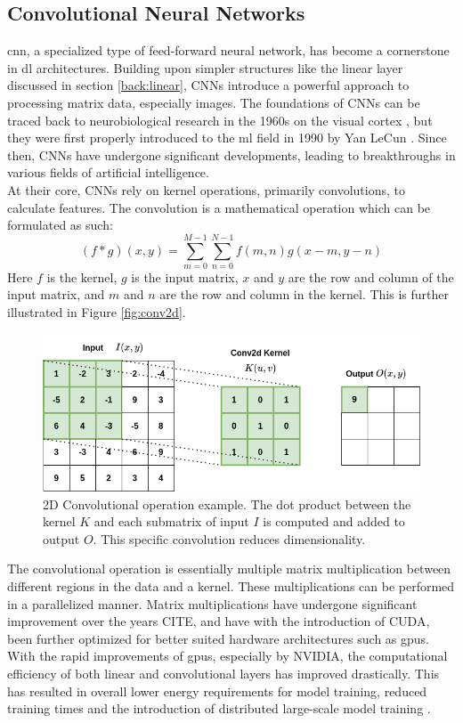 \subsection{Convolutional Neural Networks}
\label{back:cnn}

\acrfull{cnn}, a specialized type of feed-forward neural network, has become a cornerstone in \acrshort{dl} architectures. Building upon simpler structures like the linear layer discussed in section \ref{back:linear}, CNNs introduce a powerful approach to processing matrix data, especially images.
The foundations of CNNs can be traced back to neurobiological research in the 1960s on the visual cortex \cite{hubel1962receptive}, but they were first properly introduced to the \acrshort{ml} field in 1990 by Yan LeCun \cite{NIPS1989_53c3bce6}. Since then, CNNs have undergone significant developments, leading to breakthroughs in various fields of artificial intelligence. \\
%
At their core, CNNs rely on kernel operations, primarily convolutions, to calculate features. The convolution is a mathematical operation which can be formulated as such:
\begin{equation}
   (f * g)(x, y) = \sum_{m=0}^{M-1} \sum_{n=0}^{N-1} f(m, n)g(x-m, y-n) 
\label{eq:conv}
\end{equation}
Here $f$ is the kernel, $g$ is the input matrix, $x$ and $y$ are the row and column of the input matrix, and $m$ and $n$ are the row and column in the kernel. This is further illustrated in Figure \ref{fig:conv2d}.
%
\begin{figure}[!h]
    \centering
    \includegraphics[width=0.8\linewidth]{figures/convolution.png}
    \caption{2D Convolutional operation example. The dot product between the kernel $K$ and each submatrix of input $I$ is computed and added to output $O$. This specific convolution reduces dimensionality.}
    \label{fig:2dconv}
\end{figure}
%
The convolutional operation is essentially multiple matrix multiplication between different regions in the data and a kernel. These multiplications can be performed in a parallelized manner. Matrix multiplications have undergone significant improvement over the years CITE, and have with the introduction of CUDA, been further optimized for better suited hardware architectures such as \acrshort{gpu}s. With the rapid improvements of \acrshort{gpu}s, especially by NVIDIA, the computational efficiency of both linear and convolutional layers has improved drastically. This has resulted in overall lower energy requirements for model training, reduced training times and the introduction of distributed large-scale model training \cite{mungoli2023scalable}. \\ 

